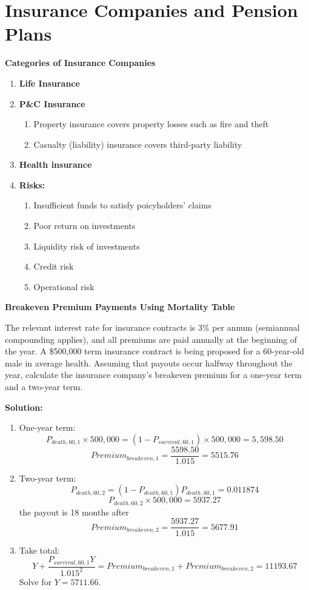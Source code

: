 \documentclass[11pt,fleqn]{book} %
\numberwithin{equation}{section} %
\numberwithin{figure}{section} %
\numberwithin{table}{section} %
\begin{document}
\chapter{Insurance Companies and Pension Plans}
\begin{definition}\textbf{Categories of Insurance Companies}
\begin{enumerate}
    \item \textbf{Life Insurance}
    \item \textbf{P\&C Insurance}
    \begin{enumerate}
        \item Property insurance covers property losses such as fire and theft
        \item Casualty (liability) insurance covers third-party liability
    \end{enumerate}
    \item \textbf{Health insurance}
    \item \textbf{Risks:}
    \begin{enumerate}
        \item Insufficient funds to satisfy poicyholders' claims
        \item Poor return on investments
        \item Liquidity risk of investments
        \item Credit risk
        \item Operational risk
    \end{enumerate}
\end{enumerate}
\end{definition}
\begin{exercise}\textbf{Breakeven Premium Payments Using Mortality Table}

The relevant interest rate for insurance contracts is 3\% per annum (semiannual
compounding applies), and all premiums are paid annually at the beginning of the year.
A \$500,000 term insurance contract is being proposed for a 60-year-old male in average
health. Assuming that payouts occur halfway throughout the year, calculate the insurance
company’s breakeven premium for a one-year term and a two-year term.

\textbf{Solution:}
\begin{enumerate}
    \item One-year term:
    $$
    P_{death,60,1}\times 500,000=(1-P_{survival,60,1})\times 500,000=5,598.50
    $$
    $$
    Premium_{breakeven,1}=\frac{5598.50}{1.015}=5515.76
    $$
    \item Two-year term:
    $$
    P_{death,60,2}=(1-P_{death,60,1})P_{death,60,1}=0.011874
    $$
    $$
    P_{death,60,2}\times 500,000=5937.27
    $$
    the payout is 18 months after
    $$
    Premium_{breakeven,2}=\frac{5937.27}{1.015}=5677.91
    $$
    \item Take total:
    $$
    Y+\frac{P_{survival,60,1}Y}{1.015^2}=Premium_{breakeven,1}+Premium_{breakeven,2}=11193.67
    $$
    Solve for $Y=5711.66$.
\end{enumerate}
\end{exercise}
\end{document}
